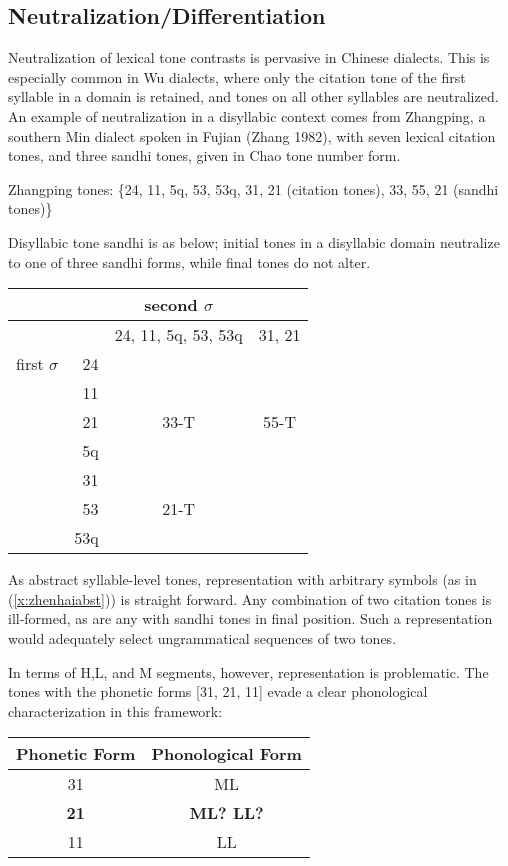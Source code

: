 \documentclass{article}
\begin{document}
\subsection{Neutralization/Differentiation}
Neutralization of lexical tone contrasts is pervasive in Chinese dialects. This is especially common in Wu dialects, where only the citation tone of the first syllable in a domain is retained, and tones on all other syllables are neutralized. An example of neutralization in a disyllabic context comes from Zhangping, a southern Min dialect spoken in Fujian (Zhang 1982), with seven lexical citation tones, and three sandhi tones, given in Chao tone number form.
\begin{exe}
\ex
Zhangping tones: \{24, 11, 5q, 53, 53q, 31, 21 (citation tones), 33, 55, 21 (sandhi tones)\}
\end{exe}
Disyllabic tone sandhi is as below; initial tones in a disyllabic domain neutralize to one of three sandhi forms, while final tones do not alter.
\begin{exe}
\ex
\begin{tabular}[t]{c|r|c|c}
&& second $\sigma$ & \\
\hline
&& 24, 11, 5q, 53, 53q & 31, 21 \\
\hline
first $\sigma$ & 24 & & \\
& 11 && \\
& 21 & 33-T & 55-T \\
& 5q && \\
\hline
& 31 && \\
& 53 & 21-T & \\
& 53q && \\
\end{tabular}
\end{exe}
As abstract syllable-level tones, representation with arbitrary symbols (as in (\ref{x:zhenhaiabst})) is straight forward. Any combination of two citation tones is ill-formed, as are any with sandhi tones in final position. Such a representation would adequately select ungrammatical sequences of two tones. \par
In terms of H,L, and M segments, however, representation is problematic. The tones with the phonetic forms [31, 21, 11] evade a clear phonological characterization in this framework:
\begin{exe}
\ex
\begin{tabular}[t]{cc}
Phonetic Form & Phonological Form  \\
\hline
31 & ML  \\
\textbf{21} & \textbf{ML?  LL?} \\
11 & LL \\
\end{tabular}
\end{exe}
\end{document}
